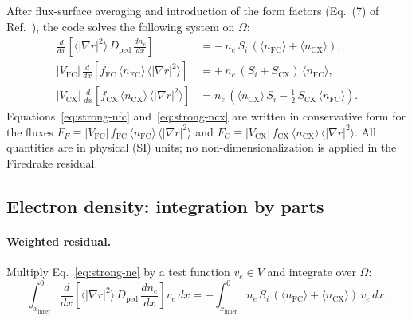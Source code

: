 After flux-surface averaging and introduction of the form factors
(Eq.~(7) of Ref.~\cite{Saarelma2023}), the code solves the following system on
$\Omega$:
\begin{subequations}
\label{eq:strong-system}
\begin{align}
  \frac{d}{dx}\!\left[\langle|\nabla r|^{2}\rangle\,D_{\mathrm{ped}}\,\frac{dn_e}{dx}\right]
    &= -\,n_e\,S_i\,(\langle n_{\mathrm{FC}}\rangle + \langle n_{\mathrm{CX}}\rangle),
  \label{eq:strong-ne}\\[4pt]
  |V_{\mathrm{FC}}|\,\frac{d}{dx}\!\left[f_{\mathrm{FC}}\,\langle n_{\mathrm{FC}}\rangle\,\langle|\nabla r|^{2}\rangle\right]
    &= +\,n_e\,(S_i + S_{\mathrm{CX}})\,\langle n_{\mathrm{FC}}\rangle,
  \label{eq:strong-nfc}\\[4pt]
  |V_{\mathrm{CX}}|\,\frac{d}{dx}\!\left[f_{\mathrm{CX}}\,\langle n_{\mathrm{CX}}\rangle\,\langle|\nabla r|^{2}\rangle\right]
    &= n_e\,\left(\langle n_{\mathrm{CX}}\rangle\,S_i - \tfrac{1}{2}\,S_{\mathrm{CX}}\,\langle n_{\mathrm{FC}}\rangle\right).
  \label{eq:strong-ncx}
\end{align}
\end{subequations}
Equations~\eqref{eq:strong-nfc} and~\eqref{eq:strong-ncx} are written in
conservative form for the fluxes
$F_F \equiv |V_{\mathrm{FC}}|\,f_{\mathrm{FC}}\,\langle n_{\mathrm{FC}}\rangle\,\langle|\nabla r|^{2}\rangle$
and
$F_C \equiv |V_{\mathrm{CX}}|\,f_{\mathrm{CX}}\,\langle n_{\mathrm{CX}}\rangle\,\langle|\nabla r|^{2}\rangle$.
All quantities are in physical (SI) units; no non-dimensionalization
is applied in the Firedrake residual.

\subsection{Electron density: integration by parts}
\label{sec:ne-weak}

\paragraph{Weighted residual.}
Multiply Eq.~\eqref{eq:strong-ne} by a test function $v_e \in V$ and
integrate over $\Omega$:
\begin{equation}
  \int_{x_{\mathrm{inner}}}^{0}
    \frac{d}{dx}\!\left[\langle|\nabla r|^{2}\rangle\,D_{\mathrm{ped}}\,\frac{dn_e}{dx}\right] v_e \, dx
  = -\int_{x_{\mathrm{inner}}}^{0} n_e\,S_i\,(\langle n_{\mathrm{FC}}\rangle + \langle n_{\mathrm{CX}}\rangle)\, v_e \, dx.
  \label{eq:ne-weighted}
\end{equation}

